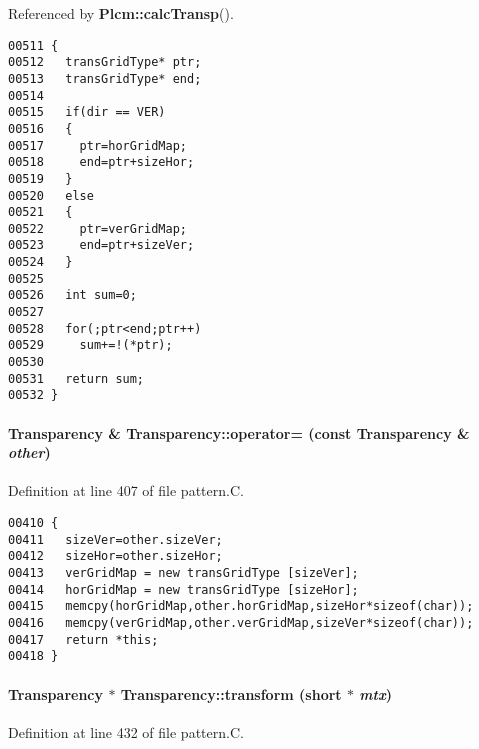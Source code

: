 Referenced by {\bf Plcm::calc\-Transp}().\small\begin{verbatim}00511 {
00512   transGridType* ptr;
00513   transGridType* end;
00514 
00515   if(dir == VER)
00516   {
00517     ptr=horGridMap;
00518     end=ptr+sizeHor;
00519   }
00520   else
00521   {
00522     ptr=verGridMap;
00523     end=ptr+sizeVer;
00524   }
00525 
00526   int sum=0;
00527 
00528   for(;ptr<end;ptr++)
00529     sum+=!(*ptr);
00530 
00531   return sum;
00532 }
\end{verbatim}\normalsize 
\label{Transparency_a3}
\paragraph{\setlength{\rightskip}{0pt plus 5cm}Transparency \& Transparency::operator= (const Transparency \& {\em other})}\hfill



Definition at line 407 of file pattern.C.\small\begin{verbatim}00410 {
00411   sizeVer=other.sizeVer;
00412   sizeHor=other.sizeHor;
00413   verGridMap = new transGridType [sizeVer];
00414   horGridMap = new transGridType [sizeHor];
00415   memcpy(horGridMap,other.horGridMap,sizeHor*sizeof(char));
00416   memcpy(verGridMap,other.verGridMap,sizeVer*sizeof(char));
00417   return *this;
00418 }
\end{verbatim}\normalsize 
\label{Transparency_a5}
\paragraph{\setlength{\rightskip}{0pt plus 5cm}Transparency $\ast$ Transparency::transform (short $\ast$ {\em mtx})}\hfill



Definition at line 432 of file pattern.C.

